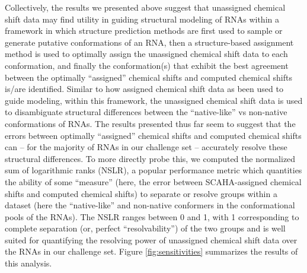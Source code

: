\documentclass[journal=jcisd8,manuscript=article,layout=onecolumn]{achemso}
\begin{document}
Collectively, the results we presented above suggest that unassigned chemical shift data may find utility in guiding structural modeling of RNAs within a framework in which structure prediction methods are first used to sample or generate putative conformations of an RNA, then a structure-based assignment method is used to optimally assign the unassigned chemical shift data to each conformation, and finally the conformation(s) that exhibit the best agreement between the optimally ``assigned'' chemical shifts and computed chemical shifts is/are identified. Similar to how assigned chemical shift data as been used to guide modeling\cite{sripakdeevong2014structure}, within this framework, the unassigned chemical shift data is used to disambiguate  structural differences between the ``native-like'' vs non-native conformations of RNAs. The results presented thus far seem to suggest that the errors between optimally ``assigned'' chemical shifts and computed chemical shifts can -- for the majority of RNAs in our challenge set -- accurately resolve these structural differences. To more directly probe this, we computed the normalized sum of logarithmic ranks (NSLR)\cite{venkatraman2010comprehensive}, a popular performance metric which quantities the ability of some ``measure''  (here, the error between SCAHA-assigned chemical shifts and computed chemical shifts) to separate or resolve groups within a dataset (here the ``native-like'' and non-native conformers in the conformational pools of the RNAs). The NSLR ranges between 0 and 1, with 1 corresponding to complete separation (or, perfect ``resolvability'') of the two groups and is well suited for quantifying the resolving power of unassigned chemical shift data over the RNAs in our challenge set\cite{frank2016can}. Figure \ref{fig:sensitivities} summarizes the results of this analysis.
\end{document}
